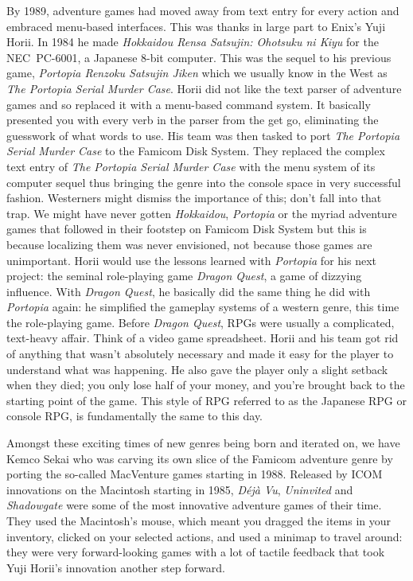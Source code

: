 \documentclass{book}
\begin{document}
By 1989, adventure games had moved away from text entry for every action and embraced menu-based interfaces. This was thanks in large part to Enix’s Yuji Horii. In 1984 he made \emph{Hokkaidou Rensa Satsujin: Ohotsuku ni Kiyu} for the NEC~PC-6001, a Japanese 8-bit computer. This was the sequel to his previous game, \emph{Portopia Renzoku Satsujin Jiken} which we usually know in the West as \emph{The Portopia Serial Murder Case}. Horii did not like the text parser of adventure games and so replaced it with a menu-based command system. It basically presented you with every verb in the parser from the get go, eliminating the guesswork of what words to use. His team was then tasked to port \emph{The Portopia Serial Murder Case} to the Famicom Disk System. They replaced the complex text entry of \emph{The Portopia Serial Murder Case} with the menu system of its computer sequel thus bringing the genre into the console space in very successful fashion. Westerners might dismiss the importance of this; don’t fall into that trap. We might have never gotten \emph{Hokkaidou}, \emph{Portopia} or the myriad adventure games that followed in their footstep on Famicom Disk System but this is because localizing them was never envisioned, not because those games are unimportant. Horii would use the lessons learned with \emph{Portopia} for his next project: the seminal role-playing game \emph{Dragon Quest}, a game of dizzying influence. With \emph{Dragon Quest}, he basically did the same thing he did with \emph{Portopia} again: he simplified the gameplay systems of a western genre, this time the role-playing game. Before \emph{Dragon Quest}, RPGs were usually a complicated, text-heavy affair. Think of a video game spreadsheet. Horii and his team got rid of anything that wasn’t absolutely necessary and made it easy for the player to understand what was happening. He also gave the player only a slight setback when they died; you only lose half of your money, and you’re brought back to the starting point of the game. This style of RPG referred to as the Japanese RPG or console RPG, is fundamentally the same to this day.\par
\FloatBarrier\vspace{\baselineskip}\begin{figure}[H]\end{figure}
Amongst these exciting times of new genres being born and iterated on, we have Kemco Sekai who was carving its own slice of the Famicom adventure genre by porting the so-called MacVenture games starting in 1988. Released by ICOM innovations on the Macintosh starting in 1985, \emph{Déjà Vu}, \emph{Uninvited} and \emph{Shadowgate} were some of the most innovative adventure games of their time. They used the Macintosh’s mouse, which meant you dragged the items in your inventory, clicked on your selected actions, and used a minimap to travel around: they were very forward-looking games with a lot of tactile feedback that took Yuji Horii’s innovation another step forward.\par
\end{document}

